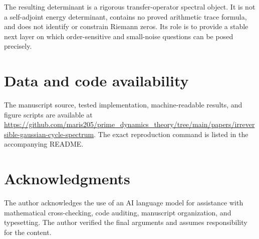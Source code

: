 \documentclass[11pt]{article}
\theoremstyle{definition}
\theoremstyle{remark}
\begin{document}
The resulting determinant is a rigorous transfer-operator spectral object.
It is not a self-adjoint energy determinant, contains no proved arithmetic
trace formula, and does not identify or constrain Riemann zeros.  Its role is
to provide a stable next layer on which order-sensitive and small-noise
questions can be posed precisely.

\section*{Data and code availability}

The manuscript source, tested implementation, machine-readable results, and
figure scripts are available at
\url{https://github.com/maris205/prime_dynamics_theory/tree/main/papers/irreversible-gaussian-cycle-spectrum}.
The exact reproduction command is listed in the accompanying README.

\section*{Acknowledgments}

The author acknowledges the use of an AI language model for assistance with
mathematical cross-checking, code auditing, manuscript organization, and
typesetting.  The author verified the final arguments and assumes
responsibility for the content.

{\small


}
\end{document}
